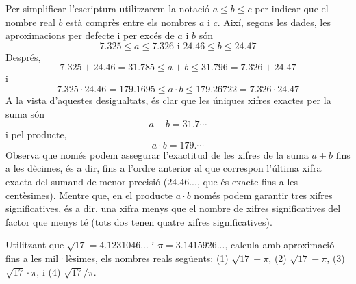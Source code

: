 \begin{solucio}
Per simplificar l’escriptura utilitzarem la notació $a\leq b\leq c$
per indicar que el nombre real $b$ està comprès entre els nombres $a$ i $c$. Així, segons les dades, les aproximacions per
defecte i per excés de $a$ i $b$ són%
\begin{equation*}
7.325\leq a\leq 7.326\text{ \ \ i \ \ }24.46\leq b\leq 24.47
\end{equation*}%
Després,%
\begin{equation*}
7.325+24.46=31.785\leq a+b\leq 31.796=7.326+24.47
\end{equation*}%
i%
\begin{equation*}
7.325\cdot 24.46=179.1695\leq a\cdot b\leq 179.26722=7.326\cdot 24.47
\end{equation*}%
A la vista d’aquestes desigualtats, és clar que les úniques xifres
exactes per la suma són%
\begin{equation*}
a+b=31.7\cdots
\end{equation*}%
i pel producte,%
\begin{equation*}
a\cdot b=179.\cdots
\end{equation*}%
Observa que només podem assegurar l’exactitud de les xifres de la suma $%
a+b$ fins a les dècimes, és a dir, fins a l’ordre anterior al que
correspon l’última xifra exacta del sumand de menor precisió ($%
24.46...$, que és exacte fins a les centèsimes). Mentre que, en el
producte $a\cdot b$ només podem garantir tres xifres significatives,
és a dir, una xifra menys que el nombre de xifres significatives del factor
que menys té (tots dos tenen quatre xifres significatives).
\end{solucio}

\begin{exercici}
Utilitzant que $\sqrt{17}=4.1231046...$ i $\pi =3.1415926...$, calcula amb
aproximació fins a les mil·lèsimes, els nombres reals següents:
(1) $\sqrt{17}+\pi $, (2) $\sqrt{17}-\pi $, (3) $\sqrt{17}\cdot \pi $, i (4) 
$\sqrt{17}/\pi $.

\end{exercici}

